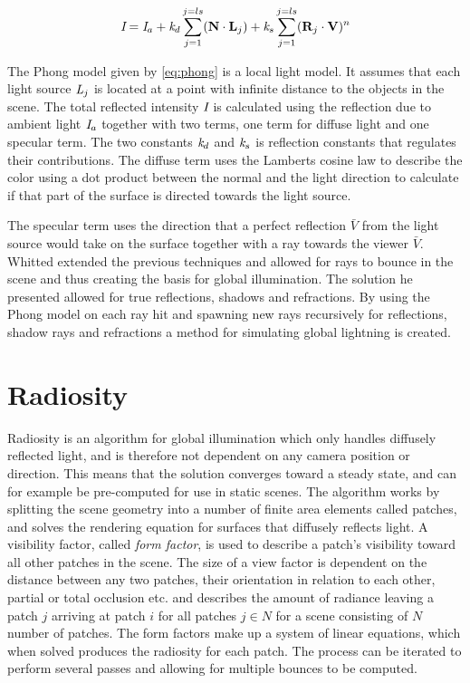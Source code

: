 \documentclass[]{report}   %
\begin{document}
\begin{equation} \label{eq:phong}
\emph{I} = \emph{I}_{a} + \emph{k}_{d} \sum_{j=1}^{j=ls} (  \mathbf{N} \cdot \mathbf{L}_j) + \emph{k}_{s} \sum_{j=1}^{j=ls} (  \mathbf{R}_j \cdot \mathbf{V})^n
\end{equation}

The Phong model given by \autoref{eq:phong} is a local light model.
It assumes that each light source $\emph{L}_j$ is located at a point with infinite distance to the objects in the scene. 
The total reflected intensity $\emph{I}$ is calculated using the reflection due to ambient light $\emph{I}_{a}$ together with two terms, one term for diffuse light and one specular term.
The two constants $\emph{k}_{d}$ and $\emph{k}_{s}$ is reflection constants that regulates their contributions.
The diffuse term uses the Lamberts cosine law to describe the color using a dot product between the normal and the light direction to calculate if that part of the surface is directed towards the light source.

The specular term uses the direction that a perfect reflection $ \bar{V} $ from the light source would take on the surface together with a ray towards the viewer $\bar{V}$.\\

Whitted extended the previous techniques and allowed for rays to bounce in the scene and thus creating the basis for global illumination.
The solution he presented allowed for true reflections, shadows and refractions.
By using the Phong model on each ray hit and spawning new rays recursively for reflections, shadow rays and refractions a method for simulating global lightning is created.

\section{Radiosity}
Radiosity is an algorithm for global illumination which only handles diffusely reflected light, and is therefore not dependent on any camera position or direction. This means that the solution converges toward a steady state, and can for example be pre-computed for use in static scenes. The algorithm works by splitting the scene geometry into a number of finite area elements called patches, and solves the rendering equation for surfaces that diffusely reflects light. A visibility factor, called \emph{form factor}, is used to describe a patch's visibility toward all other patches in the scene. The size of a view factor is dependent on the distance between any two patches, their orientation in relation to each other, partial or total occlusion etc. and describes the amount of radiance leaving a patch $j$ arriving at patch $i$ for all patches $j \in N$ for a scene consisting of $N$ number of patches. The form factors make up a system of linear equations, which when solved produces the radiosity for each patch. The process can be iterated to perform several passes and allowing for multiple bounces to be computed.
\end{document}
